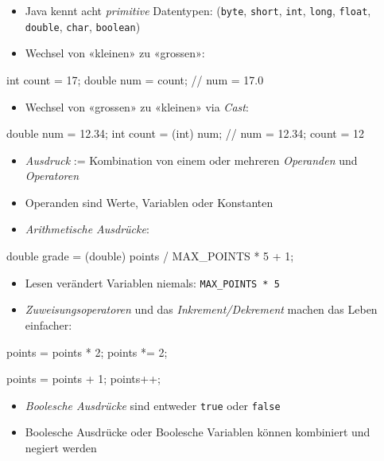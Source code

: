 \documentclass[a4paper,10pt, dvipsnames]{report}
\begin{document}
\begin{itemize}
	\item Java kennt acht \textit{primitive} Datentypen: (\texttt{byte}, \texttt{short}, \texttt{int}, \texttt{long}, \texttt{float}, \texttt{double}, \texttt{char}, \texttt{boolean})
	\item Wechsel von «kleinen» zu «grossen»:
\end{itemize}

\begin{javacodebox}
int count = 17;
double num = count; // num = 17.0
\end{javacodebox}

\begin{itemize}
	\item Wechsel von «grossen» zu «kleinen» via \textit{Cast}:
\end{itemize}

\begin{javacodebox}
double num = 12.34;
int count = (int) num; // num = 12.34; count = 12
\end{javacodebox}

\begin{itemize}
	\item \textit{Ausdruck} := Kombination von einem oder mehreren \textit{Operanden} und \textit{Operatoren}
	\item Operanden sind Werte, Variablen oder Konstanten
	\item \textit{Arithmetische Ausdrücke}:
\end{itemize}

\begin{javacodebox}
double grade = (double) points / MAX_POINTS * 5 + 1;
\end{javacodebox}

\begin{itemize}
	\item Lesen verändert Variablen niemals: \texttt{MAX\_POINTS * 5}
	\item \textit{Zuweisungsoperatoren} und das \textit{Inkrement/Dekrement} machen das Leben einfacher:
\end{itemize}

\begin{javacodebox}
points = points * 2;
points *= 2;

points = points + 1;
points++;
\end{javacodebox}

\begin{itemize}
	\item \textit{Boolesche Ausdrücke} sind entweder \texttt{true} oder \texttt{false}
	\item Boolesche Ausdrücke oder Boolesche Variablen können kombiniert und negiert werden
\end{itemize}
\end{document}
